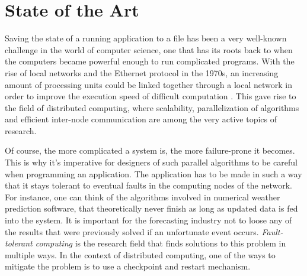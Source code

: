 {
\setlength{\parindent}{2em}
\chapter{State of the Art}\label{cha:state-of-the-art}
Saving the state of a running application to a file has been a very well-known challenge in the world of computer science, one that has its roots back to when the computers became powerful enough to run complicated programs. With the rise of local networks and the Ethernet protocol in the 1970s, an increasing amount of processing units could be linked together through a local network in order to improve the execution speed of difficult computation \cite{book:andrews}. This gave rise to the field of distributed computing, where scalability, parallelization of algorithms and efficient inter-node communication are among the very active topics of research.

Of course, the more complicated a system is, the more failure-prone it becomes. This is why it's imperative for designers of such parallel algorithms to be careful when programming an application. The application has to be made in such a way that it stays tolerant to eventual faults in the computing nodes of the network. For instance, one can think of the algorithms involved in numerical weather prediction software, that theoretically never finish as long as updated data is fed into the system. It is important for the forecasting industry not to loose any of the results that were previously solved if an unfortunate event occurs. \textit{Fault-tolerant computing} is the research field that finds solutions to this problem in multiple ways. In the context of distributed computing, one of the ways to mitigate the problem is to use a checkpoint and restart mechanism.

}
